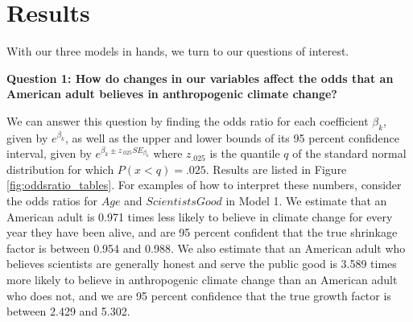 
\section{Results}

\par With our three models in hands, we turn to our questions of interest.

\bigskip \textbf{Question 1: How do changes in our variables affect the odds that an American adult believes in anthropogenic climate change?}

\par \bigskip We can answer this question by finding the odds ratio for each coefficient $\beta_k$, given by $e^{\beta_k}$, as well as the upper and lower bounds of its 95 percent confidence interval, given by $e^{\beta_k \pm z_{.025} {SE_{\beta_k}}}$ where $z_{.025}$ is the  quantile $q$ of the standard normal distribution for which $P(x < q) = .025$. Results are listed in Figure \ref{fig:oddsratio_tables}. For examples of how to interpret these numbers, consider the odds ratios for $Age$ and $ScientistsGood$ in Model 1. We estimate that an American adult is 0.971 times less likely to believe in climate change for every year they have been alive, and are 95 percent confident that the true shrinkage factor is between 0.954 and 0.988. We also estimate that an American adult who believes scientists are generally honest and serve the public good is 3.589 times more likely to believe in anthropogenic climate change than an American adult who does not, and we are 95 percent confidence that the true growth factor is between 2.429 and 5.302.

